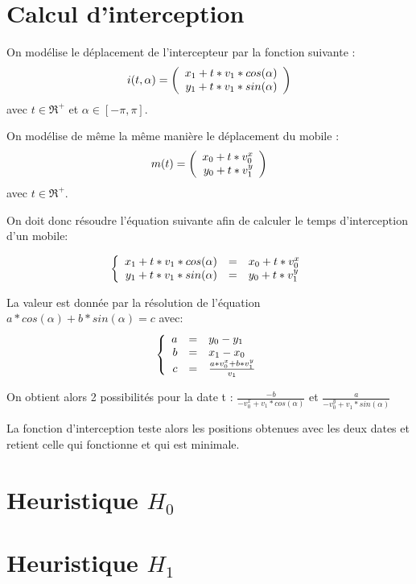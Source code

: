 \section{Calcul d'interception}

On modélise le déplacement de l'intercepteur par la fonction suivante : 
\[
i(t,\alpha) = 
\left(
\begin{array}{r c l}
 x_1 + t*v_1*cos(\alpha)\\
 y_1 + t*v_1*sin(\alpha)
\end{array}
\right)
\]
avec $t \in \Re^+$ et $\alpha \in [-\pi,\pi]$.

On modélise de même la même manière le déplacement du mobile :
\[
m(t) = 
\left(
\begin{array}{r c l}
 x_0 + t*v^{x}_0\\
 y_0 + t*v^{y}_1
\end{array}
\right)
\]
avec $t \in \Re^+$.

On doit donc résoudre l'équation suivante afin de calculer le temps d'interception d'un mobile:

\[
\left\{
\begin{array}{r c l}
x_1 + t*v_1*cos(\alpha) &=& x_0 + t*v^{x}_0\\
y_1 + t*v_1*sin(\alpha) &=& y_0 + t*v^{y}_1
\end{array}
\right.
\]

La valeur est donnée par la résolution de l'équation $a*cos(\alpha)+b*sin(\alpha) = c$ avec:
\[
\left\{
\begin{array}{r c l}
a &=& y_0 - y_1\\
b &=& x_1 - x_0\\
c &=& \frac{a*v^{x}_0 +b*v^{y}_1}{v_1}
\end{array}
\right.
\]

On obtient alors 2 possibilités pour la date t : 
$\frac{-b}{-v^{x}_0 + v_1*cos(\alpha)}$ et
$\frac{a}{-v^{y}_0 + v_1*sin(\alpha)}$

La fonction d'interception teste alors les positions obtenues avec les deux dates et retient celle qui fonctionne et qui est minimale.

\section{Heuristique $H_0$}

\section{Heuristique $H_1$}
